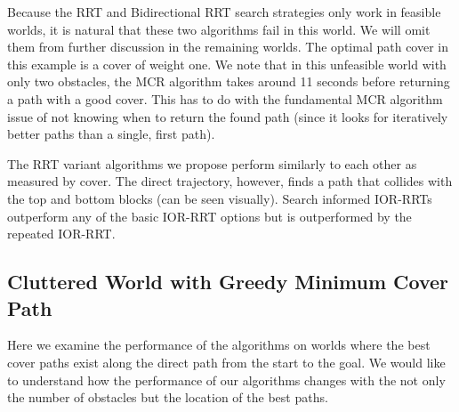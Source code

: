 
Because the RRT and Bidirectional RRT search strategies only work in feasible worlds, it is natural that these two algorithms fail in this world. We will omit them from further discussion in the remaining worlds. The optimal path cover in this example is a cover of weight one. We note that in this unfeasible world with only two obstacles, the MCR algorithm takes around 11 seconds before returning a path with a good cover. This has to do with the fundamental MCR algorithm issue of not knowing when to return the found path (since it looks for iteratively better paths than a single, first path). 

The RRT variant algorithms we propose perform similarly to each other as measured by cover. The direct trajectory, however, finds a path that collides with the top and bottom blocks (can be seen visually). Search informed IOR-RRTs outperform any of the basic IOR-RRT options but is outperformed by the repeated IOR-RRT.

\subsection{Cluttered World with Greedy Minimum Cover Path} \label{res:cluttered_world}
Here we examine the performance of the algorithms on worlds where the best cover paths exist along the direct path from the start to the goal. We would like to understand how the performance of our algorithms changes with the not only the number of obstacles but the location of the best paths.


